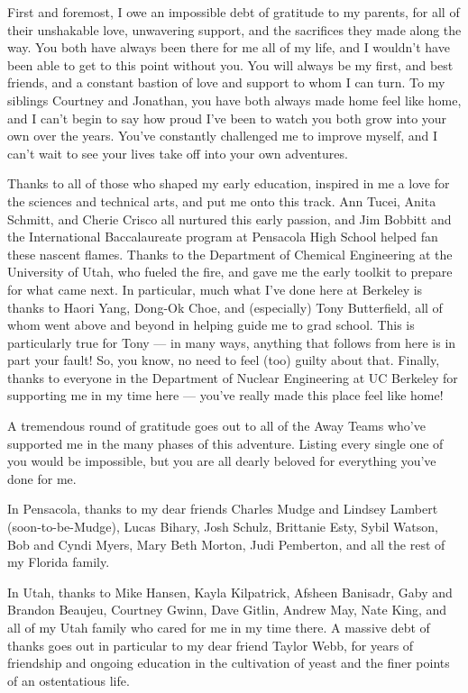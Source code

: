 \documentclass[
]{ucbthesis}
\begin{document}
\begin{frontmatter}
\begin{acknowledgements}
First and foremost, I owe an impossible debt of gratitude to my parents, for all of their unshakable love, unwavering support, and the sacrifices they made along the way. 
You both have always been there for me all of my life, and I wouldn't have been able to get to this point without you.
You will always be my first, and best friends, and a constant bastion of love and support to whom I can turn.
To my siblings Courtney and Jonathan, you have both always made home feel like home, and I can't begin to say how proud I've been to watch you both grow into your own over the years.
You've constantly challenged me to improve myself, and I can't wait to see your lives take off into your own adventures.





Thanks to all of those who shaped my early education, inspired in me a love for the sciences and technical arts, and put me onto this track.
Ann Tucei, Anita Schmitt, and Cherie Crisco all nurtured this early passion, and Jim Bobbitt and the International Baccalaureate program at Pensacola High School helped fan these nascent flames.
Thanks to the Department of Chemical Engineering at the University of Utah, who fueled the fire, and gave me the early toolkit to prepare for what came next.
In particular, much what I've done here at Berkeley is thanks to Haori Yang, Dong-Ok Choe, and (especially) Tony Butterfield, all of whom went above and beyond in helping guide me to grad school.
This is particularly true for Tony --- in many ways, anything that follows from here is in part your fault!
So, you know, no need to feel (too) guilty about that.
Finally, thanks to everyone in the Department of Nuclear Engineering at UC Berkeley for supporting me in my time here --- you've really made this place feel like home!


A tremendous round of gratitude goes out to all of the Away Teams who've supported me in the many phases of this adventure. 
Listing every single one of you would be impossible, but you are all dearly beloved for everything you've done for me.

In Pensacola, thanks to my dear friends Charles Mudge and Lindsey Lambert (soon-to-be-Mudge), Lucas Bihary, Josh Schulz, Brittanie Esty, Sybil Watson, Bob and Cyndi Myers, Mary Beth Morton, Judi Pemberton,    and all the rest of my Florida family.


In Utah, thanks to Mike Hansen, Kayla Kilpatrick, Afsheen Banisadr, Gaby and Brandon Beaujeu, Courtney Gwinn, Dave Gitlin, Andrew May, Nate King, and all of my Utah family who cared for me in my time there.
A massive debt of thanks goes out in particular to my dear friend Taylor Webb, for years of friendship and ongoing education in the cultivation of yeast and the finer points of an ostentatious life.



\end{acknowledgements}
\end{frontmatter}
\end{document}
